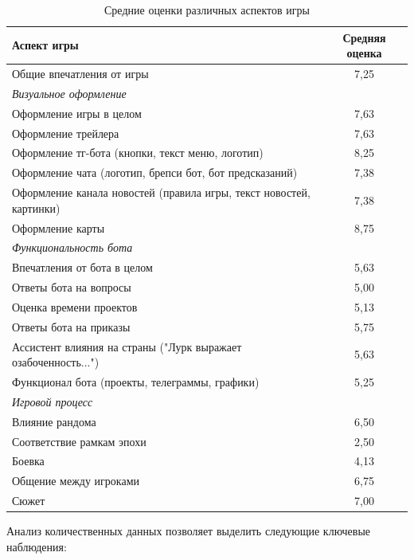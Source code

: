 \begin{table}[h]
\centering
\begin{tabular}{|l|c|}
\hline
\textbf{Аспект игры} & \textbf{Средняя оценка} \\
\hline
Общие впечатления от игры & 7,25 \\
\hline
\multicolumn{2}{|l|}{\textit{Визуальное оформление}} \\
\hline
Оформление игры в целом & 7,63 \\
Оформление трейлера & 7,63 \\
Оформление тг-бота (кнопки, текст меню, логотип) & 8,25 \\
Оформление чата (логотип, брепси бот, бот предсказаний) & 7,38 \\
Оформление канала новостей (правила игры, текст новостей, картинки) & 7,38 \\
Оформление карты & 8,75 \\
\hline
\multicolumn{2}{|l|}{\textit{Функциональность бота}} \\
\hline
Впечатления от бота в целом & 5,63 \\
Ответы бота на вопросы & 5,00 \\
Оценка времени проектов & 5,13 \\
Ответы бота на приказы & 5,75 \\
Ассистент влияния на страны ("{}Лурк выражает озабоченность..."{}) & 5,63 \\
Функционал бота (проекты, телеграммы, графики) & 5,25 \\
\hline
\multicolumn{2}{|l|}{\textit{Игровой процесс}} \\
\hline
Влияние рандома & 6,50 \\
Соответствие рамкам эпохи & 2,50 \\
Боевка & 4,13 \\
Общение между игроками & 6,75 \\
Сюжет & 7,00 \\
\hline
\end{tabular}
\caption{Средние оценки различных аспектов игры}
\label{tab:feedback-ratings}
\end{table}

Анализ количественных данных позволяет выделить следующие ключевые наблюдения:

